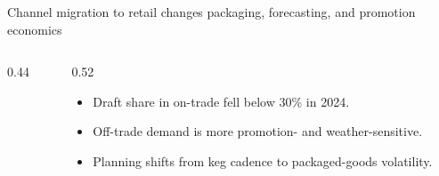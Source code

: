 \documentclass[aspectratio=169,10pt]{beamer}
\begin{document}
\begin{frame}{Channel migration to retail changes packaging, forecasting, and promotion economics}
  \begin{columns}[c,onlytextwidth]
    \begin{column}{0.44\textwidth}
    \end{column}
    \begin{column}{0.52\textwidth}
      \footnotesize
      \begin{itemize}[<+->]\setlength\itemsep{0.8em}
        \item Draft share in on-trade fell below 30\% in 2024.
        \item Off-trade demand is more promotion- and weather-sensitive.
        \item Planning shifts from keg cadence to packaged-goods volatility.
      \end{itemize}
    \end{column}
  \end{columns}
\end{frame}
\end{document}
